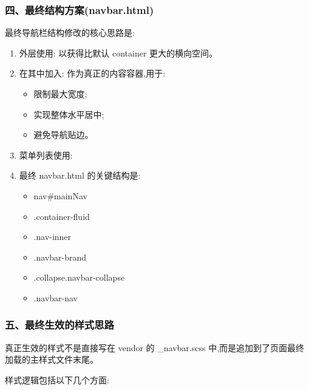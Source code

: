 \documentclass[lang=cn,scheme=chinese,color=blue,device=normal,toc=onecol,math=cm]{elegantbook}
\begin{document}
\subsubsection{四、最终结构方案(navbar.html)}


最终导航栏结构修改的核心思路是:\par


\begin{enumerate}
\item 外层使用:  以获得比默认 container 更大的横向空间。
\item 在其中加入:  作为真正的内容容器,用于:  
\begin{itemize}
\item 限制最大宽度;
\item 实现整体水平居中;
\item 避免导航贴边。
\end{itemize}
\item 菜单列表使用:
\item 最终 navbar.html 的关键结构是: 
\begin{itemize}
\item nav\#mainNav
\item .container-fluid
\item .nav-inner
\item .navbar-brand
\item .collapse.navbar-collapse
\item .navbar-nav
\end{itemize}
\end{enumerate}


\subsubsection{五、最终生效的样式思路}


真正生效的样式不是直接写在 vendor 的 \_\allowbreak{}navbar.scss 中,而是追加到了页面最终加载的主样式文件末尾。\par


样式逻辑包括以下几个方面:\par
\end{document}
